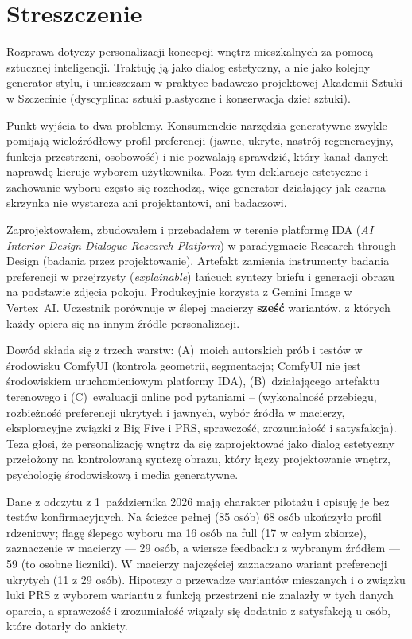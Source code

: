 \chapter*{Streszczenie}

Rozprawa dotyczy personalizacji koncepcji wnętrz mieszkalnych za pomocą sztucznej inteligencji. Traktuję ją jako dialog estetyczny, a nie jako kolejny generator stylu, i umieszczam w praktyce badawczo-projektowej Akademii Sztuki w Szczecinie (dyscyplina: sztuki plastyczne i konserwacja dzieł sztuki).

Punkt wyjścia to dwa problemy. Konsumenckie narzędzia generatywne zwykle pomijają wieloźródłowy profil preferencji (jawne, ukryte, nastrój regeneracyjny, funkcja przestrzeni, osobowość) i nie pozwalają sprawdzić, który kanał danych naprawdę kieruje wyborem użytkownika. Poza tym deklaracje estetyczne i zachowanie wyboru często się rozchodzą, więc generator działający jak czarna skrzynka nie wystarcza ani projektantowi, ani badaczowi.

Zaprojektowałem, zbudowałem i przebadałem w terenie platformę IDA (\emph{AI Interior Design Dialogue Research Platform}) w paradygmacie Research through Design (badania przez projektowanie). Artefakt zamienia instrumenty badania preferencji w przejrzysty (\emph{explainable}) łańcuch syntezy briefu i generacji obrazu na podstawie zdjęcia pokoju. Produkcyjnie korzysta z Gemini Image w Vertex~AI. Uczestnik porównuje w ślepej macierzy \textbf{sześć} wariantów, z których każdy opiera się na innym źródle personalizacji.

Dowód składa się z trzech warstw: (A)~moich autorskich prób i testów w środowisku ComfyUI (kontrola geometrii, segmentacja; ComfyUI nie jest środowiskiem uruchomieniowym platformy IDA), (B)~działającego artefaktu terenowego i (C)~ewaluacji online pod pytaniami -- (wykonalność przebiegu, rozbieżność preferencji ukrytych i jawnych, wybór źródła w macierzy, eksploracyjne związki z Big Five i PRS, sprawczość, zrozumiałość i satysfakcja). Teza głosi, że personalizację wnętrz da się zaprojektować jako dialog estetyczny przełożony na kontrolowaną syntezę obrazu, który łączy projektowanie wnętrz, psychologię środowiskową i media generatywne.

Dane z odczytu z 1~października 2026 mają charakter pilotażu i opisuję je bez testów konfirmacyjnych. Na ścieżce pełnej (85 osób) 68 osób ukończyło profil rdzeniowy; flagę ślepego wyboru ma 16 osób na full (17 w całym zbiorze), zaznaczenie w macierzy --- 29 osób, a wiersze feedbacku z wybranym źródłem --- 59 (to osobne liczniki). W macierzy najczęściej zaznaczano wariant preferencji ukrytych (11 z 29 osób). Hipotezy o przewadze wariantów mieszanych i o związku luki PRS z wyborem wariantu z funkcją przestrzeni nie znalazły w tych danych oparcia, a sprawczość i zrozumiałość wiązały się dodatnio z satysfakcją u osób, które dotarły do ankiety.

